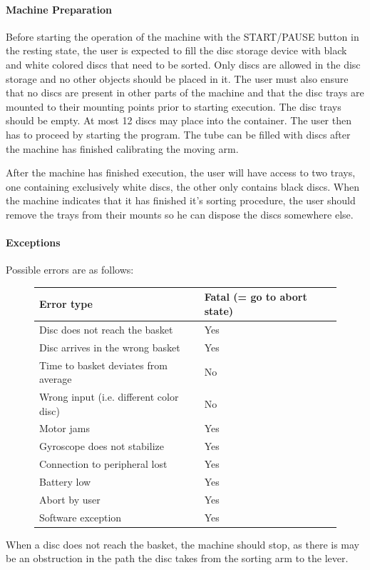 \documentclass[a4paper,oneside,11pt]{article}
\begin{document}
\paragraph{Machine Preparation}
Before starting the operation of the machine with the START/PAUSE button in the resting state, the user is expected to fill the disc storage device with black and white colored discs that need to be sorted. Only discs are allowed in the disc storage and no other objects should be placed in it. The user must also ensure that no discs are present in other parts of the machine and that the disc trays are mounted to their mounting points prior to starting execution. The disc trays should be empty. At most 12 discs may place into the container. The user then has to proceed by starting the program. The tube can be filled with discs after the machine has finished calibrating the moving arm.

After the machine has finished execution, the user will have access to two trays, one containing exclusively white discs, the other only contains black discs. When the machine indicates that it has finished it’s sorting procedure, the user should remove the trays from their mounts so he can dispose the discs somewhere else.

\paragraph{Exceptions}
Possible errors are as follows:
\begin{figure}[H]
\centering
\begin{tabular}{|l|l|}
\hline
Error type & Fatal (= go to abort state)\\\hline
Disc does not reach the basket & Yes\\\hline
Disc arrives in the wrong basket & Yes\\\hline
Time to basket deviates from average & No\\\hline
Wrong input (i.e. different color disc) & No\\\hline
Motor jams & Yes \\\hline
Gyroscope does not stabilize & Yes \\\hline
Connection to peripheral lost & Yes \\\hline
Battery low & Yes \\\hline
Abort by user & Yes \\\hline
Software exception & Yes \\\hline
\end{tabular}
\end{figure}
When a disc does not reach the basket, the machine should stop, as there is may be an obstruction in the path the disc takes from the sorting arm to the lever.
\end{document}
